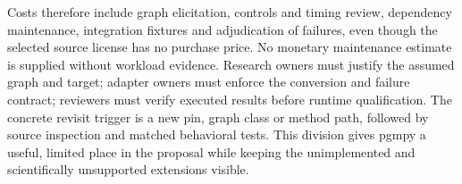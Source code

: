 Costs therefore include graph elicitation, controls and timing review,
dependency maintenance, integration fixtures and adjudication of failures,
even though the selected source license has no purchase price. No monetary
maintenance estimate is supplied without workload evidence. Research owners
must justify the assumed graph and target; adapter owners must enforce
the conversion and failure contract; reviewers must verify executed
results before runtime qualification. The concrete revisit trigger is
a new pin, graph class or method path, followed by source inspection and
matched behavioral tests. This division gives pgmpy a useful, limited
place in the proposal while keeping the unimplemented and scientifically
unsupported extensions visible.
\label{exec13:pgmpy-reuse-end}
